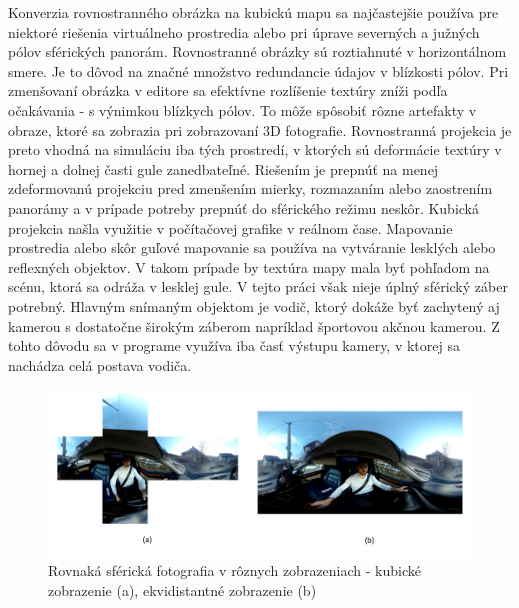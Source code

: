 \documentclass[slovak,master,dept460,male,cpp,cpdeclaration]{diploma}
\begin{document}
Konverzia rovnostranného obrázka na kubickú mapu sa najčastejšie používa pre niektoré riešenia virtuálneho prostredia alebo pri úprave severných a južných pólov sférických panorám.
Rovnostranné obrázky sú roztiahnuté v horizontálnom smere. Je to dôvod na značné množstvo redundancie údajov v blízkosti pólov. Pri zmenšovaní obrázka v editore sa efektívne rozlíšenie textúry zníži podľa očakávania - s výnimkou blízkych pólov. To môže spôsobiť rôzne artefakty v obraze, ktoré sa zobrazia pri zobrazovaní 3D fotografie. Rovnostranná projekcia je preto vhodná na simuláciu iba tých prostredí, v ktorých sú deformácie textúry v hornej a dolnej časti gule zanedbateľné. Riešením je prepnúť na menej zdeformovanú projekciu pred zmenšením mierky, rozmazaním alebo zaostrením panorámy a v prípade potreby prepnúť do sférického režimu neskôr. Kubická projekcia našla využitie v počítačovej grafike v reálnom čase. Mapovanie prostredia alebo skôr guľové mapovanie sa používa na vytváranie lesklých alebo reflexných objektov. V takom prípade by textúra mapy mala byť pohľadom na scénu, ktorá sa odráža v lesklej gule. V tejto práci však nieje  úplný sférický záber potrebný. Hlavným snímaným objektom je vodič, ktorý dokáže byť zachytený aj kamerou s dostatočne širokým záberom napríklad športovou akčnou kamerou. Z tohto dôvodu sa v programe využíva iba časť výstupu kamery, v ktorej sa nachádza celá postava vodiča.

\begin{figure}[H]
	\centering
	\includegraphics[width=1\textwidth]{Figures/cubemapVsEcti.png}
	\caption{Rovnaká sférická fotografia v rôznych zobrazeniach  - kubické zobrazenie (a), ekvidistantné zobrazenie (b)}
	\label{fig:sphereFormats}
\end{figure}


\newpage
\end{document}
